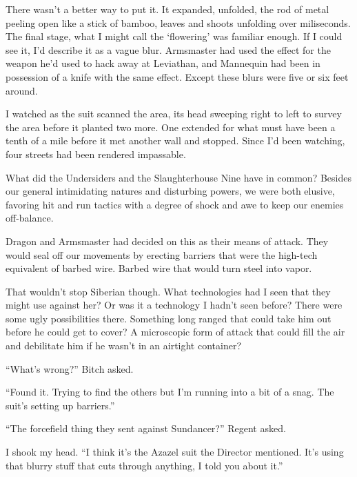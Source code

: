 There wasn't a better way to put it.  It expanded, unfolded, the rod of metal peeling open like a stick of bamboo, leaves and shoots unfolding over miliseconds.  The final stage, what I might call the `flowering' was familiar enough.  If I could see it, I'd describe it as a vague blur.  Armsmaster had used the effect for the weapon he'd used to hack away at Leviathan, and Mannequin had been in possession of a knife with the same effect.  Except these blurs were five or six feet around.



I watched as the suit scanned the area, its head sweeping right to left to survey the area before it planted two more.  One extended for what must have been a tenth of a mile before it met another wall and stopped.  Since I'd been watching, four streets had been rendered impassable.



What did the Undersiders and the Slaughterhouse Nine have in common?  Besides our general intimidating natures and disturbing powers, we were both elusive, favoring hit and run tactics with a degree of shock and awe to keep our enemies off-balance.



Dragon and Armsmaster had decided on this as their means of attack.  They would seal off our movements by erecting barriers that were the high-tech equivalent of barbed wire.  Barbed wire that would turn steel into vapor.



That wouldn't stop Siberian though.  What technologies had I seen that they might use against her?  Or was it a technology I hadn't seen before?  There were some ugly possibilities there.  Something long ranged that could take him out before he could get to cover?  A microscopic form of attack that could fill the air and debilitate him if he wasn't in an airtight container?



``What's wrong?'' Bitch asked.



``Found it.  Trying to find the others but I'm running into a bit of a snag.  The suit's setting up barriers.''



``The forcefield thing they sent against Sundancer?''  Regent asked.



I shook my head.  ``I think it's the Azazel suit the Director mentioned.  It's using that blurry stuff that cuts through anything, I told you about it.''



